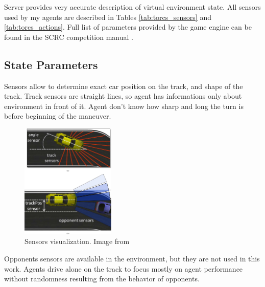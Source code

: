 \documentclass[declaration,shortabstract,english,inz]{iithesis}
\begin{document}
Server provides very accurate description of virtual environment state.
All sensors used by my agents are described in Tables \ref{tab:torcs_sensors} and \ref{tab:torcs_actions}.
Full list of parameters provided by the game engine can be found in the SCRC competition manual \cite{scrc_manual}.

\subsection{State Parameters}

Sensors allow to determine exact car position on the track, and shape of the track.
Track sensors are straight lines, so agent has informations only about environment in front of it. Agent don't know how sharp and long the turn is before beginning of the  maneuver.

\begin{figure}[h]
    \centering
    \includegraphics[width=0.4\textwidth]{img/sensors.png}
    \caption{Sensors visualization. Image from \cite{SCRC}}
    \label{fig:sensors_img}
\end{figure}


Opponents sensors are available in the environment, but they are not used in this work. Agents drive alone on the track to focus mostly on agent performance without randomness resulting from the behavior of opponents.
\end{document}
